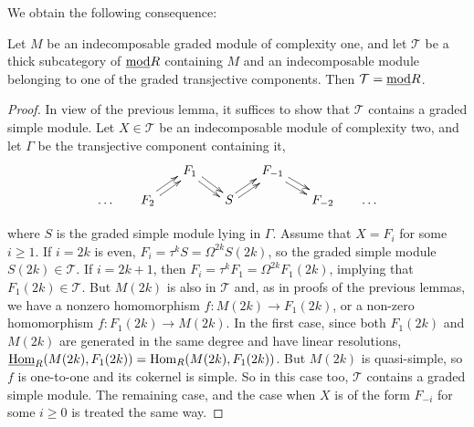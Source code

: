 \documentclass[10pt]{amsart}
\begin{document}
\noindent We obtain the following consequence:
%
\begin{cor} Let $M$ be an indecomposable graded module of complexity one, and let 
$\mathcal T$ be a thick subcategory of $\underline{\operatorname{mod}} R$ containing 
$M$ and an indecomposable module belonging to one of the graded transjective components.
 Then $\mathcal T=\underline{\operatorname{mod}} R$.
\end{cor}
%
\begin{proof} In view of the previous lemma, it suffices to show that $\mathcal T$ 
contains a graded simple module. Let $X\in\mathcal T$ be an indecomposable module of complexity two, 
and let $\Gamma$ be the transjective component containing it, 
$$\xymatrix@R=8pt@C=16pt{
 && F_1 \ar@<.5ex>[dr]\ar@<-0.5ex>[dr]  
& &
F_{-1} \ar@<.5ex>[dr]\ar@<-0.5ex>[dr]  
&&\\  \dots &
F_2\ar@<.5ex>[ur]\ar@<-0.5ex>[ur]  
&&
S \ar@<.5ex>[ur]\ar@<-0.5ex>[ur]  
&&
F_{-2} &\dots} $$ 

\noindent where $S$ is the graded simple module lying in $\Gamma$. Assume that $X=F_i$ for some $i\ge 1$. 
If $i=2k$ is even, $F_i=\tau^kS=\Omega^{2k}S(2k)$, 
so the graded simple module $S(2k)\in\mathcal T$. If $i=2k+1$, then $F_i=\tau^kF_1=\Omega^{2k}F_1(2k)$, 
implying that $F_1(2k)\in\mathcal T$. 
 But  $M(2k)$ is also in $\mathcal T$ and, as in proofs of the previous lemmas, we have a nonzero homomorphism 
 $f\colon M(2k)\rightarrow F_1(2k)$, or a non-zero homomorphism $f\colon F_1(2k)\rightarrow M(2k)$. 
In the first case, since both $F_1(2k)$ and $M(2k)$ are 
generated in the same degree and have linear resolutions, 
$\underline{\operatorname{Hom}}_R(M(2k),F_1(2k))=\operatorname{Hom}_R(M(2k),F_1(2k))$. But $M(2k)$ is quasi-simple, 
so $f$ is one-to-one and its cokernel is simple. So in this case too,
$\mathcal T$ contains a graded simple module. The remaining case, and the case when $X$ is 
of the form $F_{-i}$ for some $i\ge 0$ is treated the same way. 
\end{proof}

\end{document}
